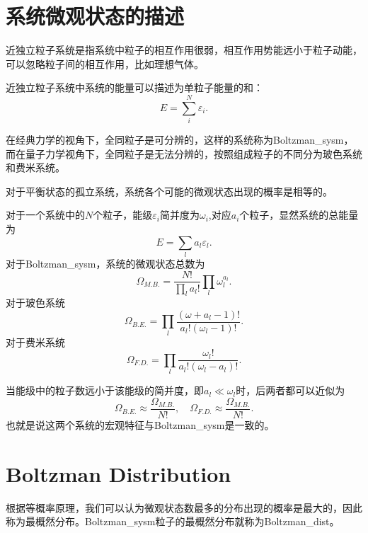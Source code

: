 \section{系统微观状态的描述}
近独立粒子系统是指系统中粒子的相互作用很弱，相互作用势能远小于粒子动能，可以忽略粒子间的相互作用，比如理想气体。

近独立粒子系统中系统的能量可以描述为单粒子能量的和：
\begin{equation}
    E=\sum_i^N \varepsilon_i.
\end{equation}

在经典力学的视角下，全同粒子是可分辨的，这样的系统称为\gls{Boltzman_sysm}，而在量子力学视角下，全同粒子是无法分辨的，按照组成粒子的不同分为玻色系统和费米系统。

\begin{theorem}[等概率原理]
    对于平衡状态的孤立系统，系统各个可能的微观状态出现的概率是相等的。
\end{theorem}

对于一个系统中的$N$个粒子，能级$\varepsilon_i$简并度为$\omega_i$,对应$a_i$个粒子，显然系统的总能量为
\begin{equation}
    E=\sum_l a_l\varepsilon_l.
\end{equation}
对于\gls{Boltzman_sysm}，系统的微观状态总数为
\begin{equation}
    \Omega_{M.B.}=\frac{N!}{\prod_l a_l!}\prod_l \omega_l^{a_l}.
\end{equation}
对于玻色系统
\begin{equation}
    \Omega_{B.E.}=\prod_l\frac{(\omega+a_l-1)!}{a_l!(\omega_l-1)!}.
\end{equation}
对于费米系统
\begin{equation}
    \Omega_{F.D.}=\prod_l\frac{\omega_l!}{a_l!(\omega_l-a_l)!}.
\end{equation}

当能级中的粒子数远小于该能级的简并度，即$a_l\ll \omega_l$时，后两者都可以近似为
\begin{equation}
    \Omega_{B.E.}\approx\frac{\Omega_{M.B.}}{N!},\quad \Omega_{F.D.}\approx\frac{\Omega_{M.B.}}{N!}.
\end{equation}
也就是说这两个系统的宏观特征与\gls{Boltzman_sysm}是一致的。

\section{Boltzman Distribution}
根据等概率原理，我们可以认为微观状态数最多的分布出现的概率是最大的，因此称为最概然分布。\gls{Boltzman_sysm}粒子的最概然分布就称为\gls{Boltzman_dist}。

